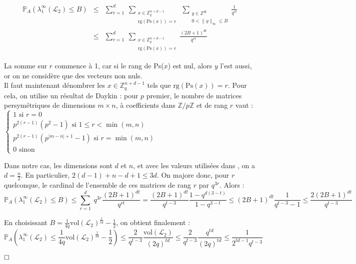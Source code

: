 \documentclass[11pt,a4paper]{article}
\begin{document}
\begin{eqnarray*}
\mathbb{P}_A(\lambda_1^\infty(\mathcal{L}_2) \leq B) &\leq& \sum_{r=1}^d \ \sum_{\substack{x \in \mathbb{Z}_q^{n+d-1} \\ \text{rg}(\text{Ps}(x))=r}} \   \sum_{\substack{y \in \mathbb{Z}^{dt} \\ 0 < \|y\|_\infty \leq B}} \frac{1}{q^{rt}} \\
&\leq& \sum_{r=1}^d \ \sum_{\substack{x \in \mathbb{Z}_q^{n+d-1} \\ \text{rg}(\text{Ps}(x))=r}} \frac{(2B+1)^{dt}}{q^{rt}}
\end{eqnarray*}

La somme sur $r$ commence à 1, car si le rang de Ps($x$) est nul, alors $y$ l'est aussi, or on ne considère que des vecteurs non nuls.\\
Il faut maintenant dénombrer les $x\in \mathbb{Z}_q^{n+d-1}$ tels que $\text{rg}(\text{Ps}(x))=r$. Pour cela, on utilise un résultat de Daykin \cite{rank} : pour $p$ premier, le nombre de matrices persymétriques de dimensions $m\times n$, à coefficients dans $\mathbb{Z}/p\mathbb{Z}$ et de rang $r$ vaut : $\begin{cases} 1 \text{ si } r=0 \\ p^{2(r-1)}(p^2-1) \text{ si } 1 \leq r < \min(m,n) \\ p^{2(r-1)}(p^{|m-n|+1}-1) \text{ si } r=\min(m,n) \\ 0 \text{ sinon} \end{cases}$

Dans notre cas, les dimensions sont $d$ et $n$, et avec les valeurs utilisées dans \cite{mplwe}, on a $d=\frac{n}{2}$. En particulier, $2(d-1)+n-d +1 \leq 3d$. On majore donc, pour $r$ quelconque, le cardinal de l'ensemble de ces matrices de rang $r$ par $q^{3r}$. Alors : 
\[ \mathbb{P}_A(\lambda_1^\infty(\mathcal{L}_2) \leq B) \leq \sum_{r=1}^d \ q^{3r} \frac{(2B+1)^{dt}}{q^{rt}} = \frac{(2B+1)^{dt}}{q^{t-3}}\frac{1-q^{d(3-t)}}{1-q^{3-t}} \leq (2B+1)^{dt}\frac{1}{q^{t-3}-1} \leq \frac{2(2B+1)^{dt}}{q^{t-3}} 
\]

En choisissant $B=\frac{1}{4q}\text{vol}(\mathcal{L}_2)^{\frac{1}{td}}-\frac{1}{2}$, on obtient finalement : 
\[ \mathbb{P}_A(\lambda_1^\infty(\mathcal{L}_2) \leq \frac{1}{4q}\text{vol}(\mathcal{L}_2)^{\frac{1}{td}}-\frac{1}{2}) \leq \frac{2}{q^{t-3}}\frac{\text{vol}(\mathcal{L}_2)}{(2q)^{td}} \leq \frac{2}{q^{t-3}}\frac{q^{td}}{(2q)^{td}} \leq \frac{1}{2^{td-1}q^{t-3}} \]

$\hfill \square$ \\
\end{document}
